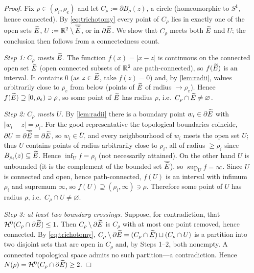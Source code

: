 \begin{proof}
Fix $\rho\in(\rho_i,\rho_e)$ and let $C_\rho:=\partial B_\rho(z)$, a circle
(homeomorphic to $S^1$, hence connected). By \eqref{eq:trichotomy} every
point of $C_\rho$ lies in exactly one of the open sets $\widetilde{E}$,
$U:=\mathbb{R}^2\setminus\overline{\widetilde{E}}$, or in $\partial\widetilde{E}$. We show that
$C_\rho$ meets both $\widetilde{E}$ and $U$; the conclusion then follows from a
connectedness count.

\emph{Step 1: $C_\rho$ meets $\widetilde{E}$.} The function $f(x)=|x-z|$ is
continuous on the connected open set $\widetilde{E}$ (open connected subsets of
$\mathbb{R}^2$ are path-connected), so $f(\widetilde{E})$ is an interval. It contains $0$
(as $z\in\widetilde{E}$, take $f(z)=0$) and, by \cref{lem:radii}, values
arbitrarily close to $\rho_e$ from below (points of $\widetilde{E}$ of radius
$\to\rho_e$). Hence $f(\widetilde{E})\supseteq[0,\rho_e)\ni\rho$, so some point of
$\widetilde{E}$ has radius $\rho$, i.e.\ $C_\rho\cap\widetilde{E}\neq\varnothing$.

\emph{Step 2: $C_\rho$ meets $U$.} By \cref{lem:radii} there is a boundary
point $w_i\in\partial\widetilde{E}$ with $|w_i-z|=\rho_i$. For the good
representative the topological boundaries coincide, $\partial U=\partial
\overline{\widetilde{E}}=\partial\widetilde{E}$, so $w_i\in\overline U$, and every
neighbourhood of $w_i$ meets the open set $U$; thus $U$ contains points of
radius arbitrarily close to $\rho_i$, all of radius $\ge\rho_i$ since
$B_{\rho_i}(z)\subseteq\widetilde{E}$. Hence $\inf_{U}f=\rho_i$ (not necessarily
attained). On the
other hand $U$ is unbounded (it is the complement of the bounded set
$\overline{\widetilde{E}}$), so $\sup_U f=\infty$. Since $U$ is connected and open,
hence path-connected, $f(U)$ is an interval with infimum $\rho_i$ and
supremum $\infty$, so $f(U)\supseteq(\rho_i,\infty)\ni\rho$. Therefore some
point of $U$ has radius $\rho$, i.e.\ $C_\rho\cap U\neq\varnothing$.

\emph{Step 3: at least two boundary crossings.} Suppose, for contradiction,
that $\mathcal{H}^0(C_\rho\cap\partial\widetilde{E})\le1$. Then $C_\rho\setminus\partial\widetilde{E}$
is $C_\rho$ with at most one point removed, hence connected. By
\eqref{eq:trichotomy}, $C_\rho\setminus\partial\widetilde{E}=(C_\rho\cap\widetilde{E})\sqcup
(C_\rho\cap U)$ is a partition into two disjoint sets that are open in
$C_\rho$ and, by Steps 1--2, both nonempty. A connected topological space
admits no such partition---a contradiction. Hence
$N(\rho)=\mathcal{H}^0(C_\rho\cap\partial\widetilde{E})\ge2$.
\end{proof}

